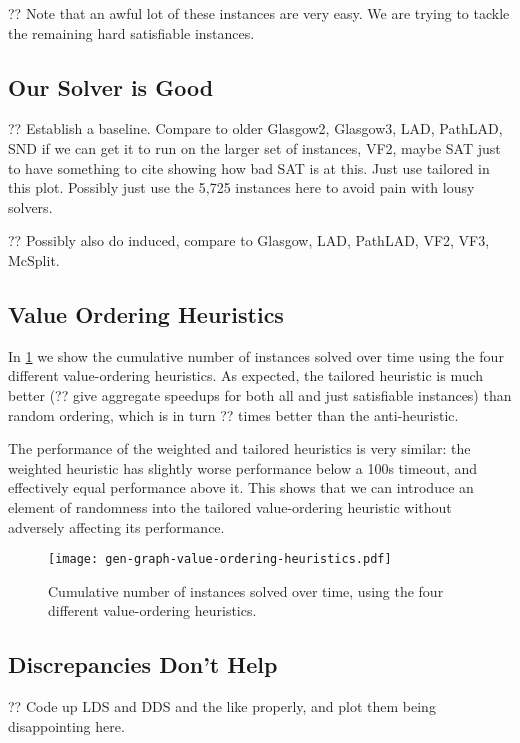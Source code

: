 \documentclass{article}
\begin{document}
?? Note that an awful lot of these instances are very easy. We are trying to tackle the remaining
hard satisfiable instances.

\subsection{Our Solver is Good}

?? Establish a baseline. Compare to older Glasgow2, Glasgow3, LAD, PathLAD, SND if we can get it to
run on the larger set of instances, VF2, maybe SAT just to have something to cite showing how bad
SAT is at this. Just use tailored in this plot. Possibly just use the 5,725 instances here to avoid
pain with lousy solvers.

?? Possibly also do induced, compare to Glasgow, LAD, PathLAD, VF2, VF3, McSplit.

\subsection{Value Ordering Heuristics}

In \cref{figure:value-ordering-heuristics} we show the cumulative number of instances solved over
time using the four different value-ordering heuristics. As expected, the tailored heuristic is much
better (?? give aggregate speedups for both all and just satisfiable instances) than random
ordering, which is in turn ?? times better than the anti-heuristic.

The performance of the weighted and tailored heuristics is very similar: the weighted heuristic has
slightly worse performance below a 100s timeout, and effectively equal performance above it. This
shows that we can introduce an element of randomness into the tailored value-ordering heuristic
without adversely affecting its performance.

\begin{figure}[tb]
    \centering
    \texttt{[image: gen-graph-value-ordering-heuristics.pdf]}

    \caption{Cumulative number of instances solved over time, using the four different
    value-ordering heuristics.}
    \label{figure:value-ordering-heuristics}
\end{figure}

\subsection{Discrepancies Don't Help}

?? Code up LDS and DDS and the like properly, and plot them being disappointing here.
\end{document}
